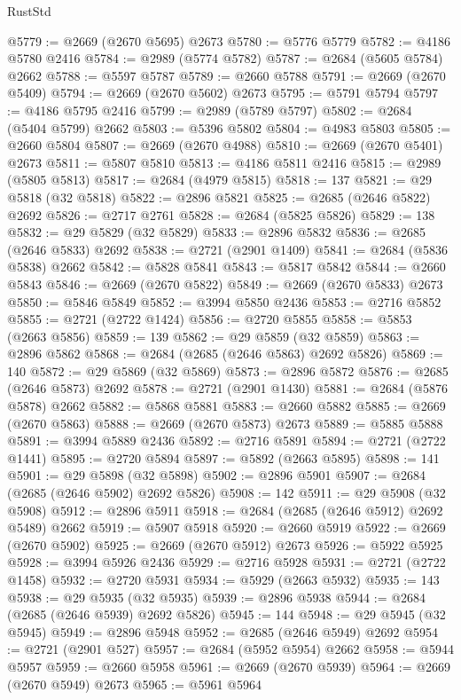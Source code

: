 \begin{lexlean}{RustStd}
\begin{coremodule}
@5779 := @2669 (@2670 @5695) @2673
@5780 := @5776 @5779
@5782 := @4186 @5780 @2416
@5784 := @2989 (@5774 @5782)
@5787 := @2684 (@5605 @5784) @2662
@5788 := @5597 @5787
@5789 := @2660 @5788
@5791 := @2669 (@2670 @5409)
@5794 := @2669 (@2670 @5602) @2673
@5795 := @5791 @5794
@5797 := @4186 @5795 @2416
@5799 := @2989 (@5789 @5797)
@5802 := @2684 (@5404 @5799) @2662
@5803 := @5396 @5802
@5804 := @4983 @5803
@5805 := @2660 @5804
@5807 := @2669 (@2670 @4988)
@5810 := @2669 (@2670 @5401) @2673
@5811 := @5807 @5810
@5813 := @4186 @5811 @2416
@5815 := @2989 (@5805 @5813)
@5817 := @2684 (@4979 @5815)
@5818 := 137
@5821 := @29 @5818 (@32 @5818)
@5822 := @2896 @5821
@5825 := @2685 (@2646 @5822) @2692
@5826 := @2717 @2761
@5828 := @2684 (@5825 @5826)
@5829 := 138
@5832 := @29 @5829 (@32 @5829)
@5833 := @2896 @5832
@5836 := @2685 (@2646 @5833) @2692
@5838 := @2721 (@2901 @1409)
@5841 := @2684 (@5836 @5838) @2662
@5842 := @5828 @5841
@5843 := @5817 @5842
@5844 := @2660 @5843
@5846 := @2669 (@2670 @5822)
@5849 := @2669 (@2670 @5833) @2673
@5850 := @5846 @5849
@5852 := @3994 @5850 @2436
@5853 := @2716 @5852
@5855 := @2721 (@2722 @1424)
@5856 := @2720 @5855
@5858 := @5853 (@2663 @5856)
@5859 := 139
@5862 := @29 @5859 (@32 @5859)
@5863 := @2896 @5862
@5868 := @2684 (@2685 (@2646 @5863) @2692 @5826)
@5869 := 140
@5872 := @29 @5869 (@32 @5869)
@5873 := @2896 @5872
@5876 := @2685 (@2646 @5873) @2692
@5878 := @2721 (@2901 @1430)
@5881 := @2684 (@5876 @5878) @2662
@5882 := @5868 @5881
@5883 := @2660 @5882
@5885 := @2669 (@2670 @5863)
@5888 := @2669 (@2670 @5873) @2673
@5889 := @5885 @5888
@5891 := @3994 @5889 @2436
@5892 := @2716 @5891
@5894 := @2721 (@2722 @1441)
@5895 := @2720 @5894
@5897 := @5892 (@2663 @5895)
@5898 := 141
@5901 := @29 @5898 (@32 @5898)
@5902 := @2896 @5901
@5907 := @2684 (@2685 (@2646 @5902) @2692 @5826)
@5908 := 142
@5911 := @29 @5908 (@32 @5908)
@5912 := @2896 @5911
@5918 := @2684 (@2685 (@2646 @5912) @2692 @5489) @2662
@5919 := @5907 @5918
@5920 := @2660 @5919
@5922 := @2669 (@2670 @5902)
@5925 := @2669 (@2670 @5912) @2673
@5926 := @5922 @5925
@5928 := @3994 @5926 @2436
@5929 := @2716 @5928
@5931 := @2721 (@2722 @1458)
@5932 := @2720 @5931
@5934 := @5929 (@2663 @5932)
@5935 := 143
@5938 := @29 @5935 (@32 @5935)
@5939 := @2896 @5938
@5944 := @2684 (@2685 (@2646 @5939) @2692 @5826)
@5945 := 144
@5948 := @29 @5945 (@32 @5945)
@5949 := @2896 @5948
@5952 := @2685 (@2646 @5949) @2692
@5954 := @2721 (@2901 @527)
@5957 := @2684 (@5952 @5954) @2662
@5958 := @5944 @5957
@5959 := @2660 @5958
@5961 := @2669 (@2670 @5939)
@5964 := @2669 (@2670 @5949) @2673
@5965 := @5961 @5964

\end{coremodule}
\end{lexlean}

